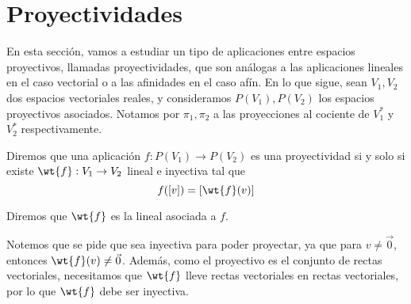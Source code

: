 \section{Proyectividades}

En esta sección, vamos a estudiar un tipo de aplicaciones entre espacios proyectivos, llamadas proyectividades, que son análogas a las aplicaciones lineales en el caso vectorial o a las afinidades en el caso afín.
En lo que sigue, sean $V_1,V_2$ dos espacios vectoriales reales, y consideramos $P(V_1),P(V_2)$ los espacios proyectivos asociados.
Notamos por $\pi_1,\pi_2$ a las proyecciones al cociente de $V_1^\ast$ y $V_2^\ast$ respectivamente.

\begin{definicion}[Proyectividad]
    Diremos que una aplicación $f:P(V_1)\to P(V_2)$ es una proyectividad si y solo si existe $\wt{f}:V_1\to V_2$ lineal e inyectiva tal que
    \begin{equation*}
        f([v])=\left[\wt{f}(v)\right]
    \end{equation*}

    Diremos que $\wt{f}$ es la lineal asociada a $f$.

    \begin{figure}[H]
        \centering
    \end{figure}
\end{definicion}
Notemos que se pide que sea inyectiva para poder proyectar, ya que para $v\neq \vec{0}$, entonces $\wt{f}(v)\neq \vec{0}$.
Además, como el proyectivo es el conjunto de rectas vectoriales, necesitamos que $\wt{f}$ lleve rectas vectoriales en rectas vectoriales,
por lo que $\wt{f}$ debe ser inyectiva.

